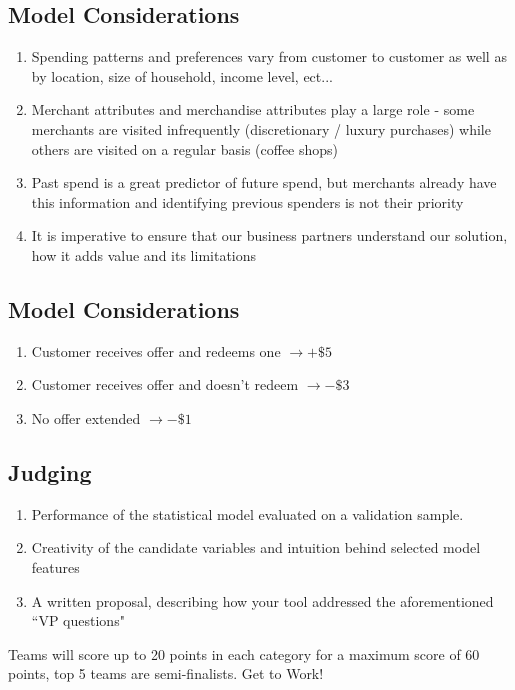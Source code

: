 \documentclass[12pt]{article} %
\begin{document}
\subsection{Model Considerations}
\begin{enumerate}
\item Spending patterns and preferences vary from customer to customer as well as by location, size of household, income level, ect...
\item Merchant attributes and merchandise attributes play a large role - some merchants are visited infrequently (discretionary / luxury purchases) while others are visited on a regular basis (coffee shops)
\item Past spend is a great predictor of future spend, but merchants already have this information and identifying previous spenders is not their priority
\item It is imperative to ensure that our business partners understand our solution, how it adds value and its limitations
\end{enumerate}

\subsection{Model Considerations}
\begin{enumerate}
\item Customer receives offer and redeems one $\rightarrow +\$5$
\item Customer receives offer and doesn't redeem $\rightarrow -\$3$
\item No offer extended $\rightarrow -\$1$
\end{enumerate}


\subsection{Judging}
\begin{enumerate}
\item Performance of the statistical model evaluated on a validation sample.
\item Creativity of the candidate variables and intuition behind selected model features
\item A written proposal, describing how your tool addressed the aforementioned ``VP questions"
\end {enumerate}
Teams will score up to 20 points in each category for a maximum score of 60 points, top 5 teams are semi-finalists.
\ac{Get to Work!}
\end{document}
